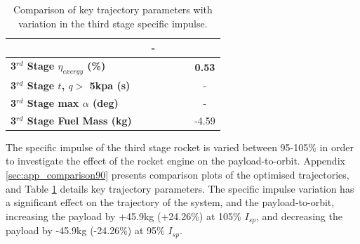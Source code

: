 \begin{table}[ht]
\begin{tabular}{l c c c c c c}
		& \secondFlightTimeTThreeOneHundredTenNoReturn
		& -
		\\
		\hline 
		\textbf{3$^{rd}$ Stage $\eta_{exergy}$ (\%)}
		& \textbf{\thirddExergyEffTThreeNinetyNoReturn}
		& \textbf{\thirddExergyEffTThreeNinetyFiveNoReturn}
		& \textbf{\thirddExergyEffTThreeStandardNoReturn}
		& \textbf{\thirddExergyEffTThreeOneHundredFiveNoReturn}
		& \textbf{\thirddExergyEffTThreeOneHundredTenNoReturn}
		& \textbf{0.53}
		\\
		\textbf{3$^{rd}$ Stage $t$, $q >$ 5kpa (s)}
		& \thirdqOverFiveTThreeNinetyNoReturn
		& \thirdqOverFiveTThreeNinetyFiveNoReturn
		& \thirdqOverFiveTThreeStandardNoReturn
		& \thirdqOverFiveTThreeOneHundredFiveNoReturn
		& \thirdqOverFiveTThreeOneHundredTenNoReturn
		& -
		\\
		\textbf{3$^{rd}$ Stage max $\alpha$ (deg)}
		& \thirdmaxAoATThreeNinetyNoReturn
		& \thirdmaxAoATThreeNinetyFiveNoReturn
		& \thirdmaxAoATThreeStandardNoReturn
		& \thirdmaxAoATThreeOneHundredFiveNoReturn
		& \thirdmaxAoATThreeOneHundredTenNoReturn
		& -
		\\
		\textbf{3$^{rd}$ Stage Fuel Mass (kg)}
		& \thirdmFuelTThreeNinetyNoReturn
		& \thirdmFuelTThreeNinetyFiveNoReturn
		& \thirdmFuelTThreeStandardNoReturn
		& \thirdmFuelTThreeOneHundredFiveNoReturn
		& \thirdmFuelTThreeOneHundredTenNoReturn
		&-4.59
		\\
		\hline 
	\end{tabular} 
	\caption{Comparison of key trajectory parameters with variation in the third stage specific impulse.}
	\label{tab:comparison90}
\end{table}

The specific impulse of the third stage rocket is varied between 95-105\% in order to investigate the effect of the rocket engine on the payload-to-orbit. Appendix \ref{sec:app_comparison90} presents comparison plots of the optimised trajectories, and Table \ref{tab:comparison90} details key trajectory parameters. 
The specific impulse variation has a significant effect on the trajectory of the system, and the payload-to-orbit, increasing the payload by +45.9kg (+24.26\%) at 105\% $I_{sp}$, and decreasing the payload by -45.9kg (-24.26\%) at 95\% $I_{sp}$. 

